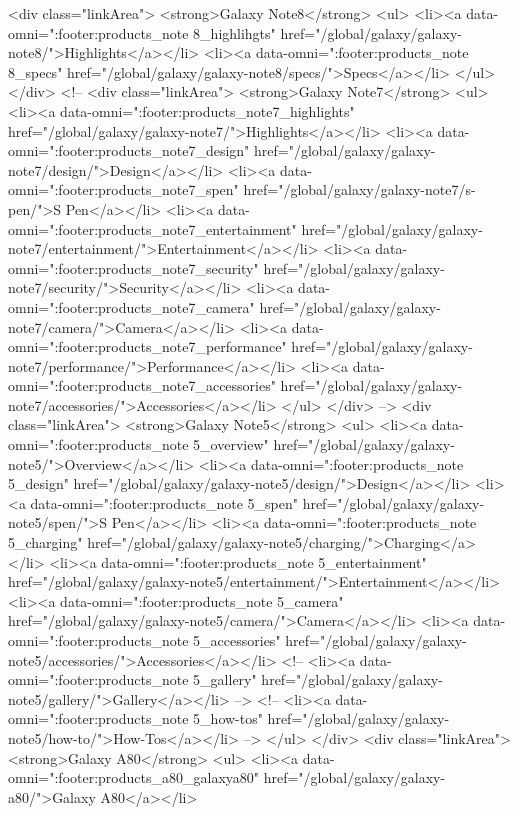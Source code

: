 {{{{{{{{{{{{{{{{{{{{{{{{{{{{{{{{{{{{{{{{{{{{{{{{{{{{{		<div class="linkArea">
			<strong>Galaxy Note8</strong>
			<ul>
				<li><a data-omni=":footer:products_note 8_highlihgts" href="/global/galaxy/galaxy-note8/">Highlights</a></li>
				<li><a data-omni=":footer:products_note 8_specs" href="/global/galaxy/galaxy-note8/specs/">Specs</a></li>
			</ul>
		</div>
		<!-- <div class="linkArea">
			<strong>Galaxy Note7</strong>
			<ul>
				<li><a data-omni=":footer:products_note7_highlights" href="/global/galaxy/galaxy-note7/">Highlights</a></li>
				<li><a data-omni=":footer:products_note7_design" href="/global/galaxy/galaxy-note7/design/">Design</a></li>
				<li><a data-omni=":footer:products_note7_spen" href="/global/galaxy/galaxy-note7/s-pen/">S Pen</a></li>
				<li><a data-omni=":footer:products_note7_entertainment" href="/global/galaxy/galaxy-note7/entertainment/">Entertainment</a></li>
				<li><a data-omni=":footer:products_note7_security" href="/global/galaxy/galaxy-note7/security/">Security</a></li>
				<li><a data-omni=":footer:products_note7_camera" href="/global/galaxy/galaxy-note7/camera/">Camera</a></li>
				<li><a data-omni=":footer:products_note7_performance" href="/global/galaxy/galaxy-note7/performance/">Performance</a></li>
				<li><a data-omni=":footer:products_note7_accessories" href="/global/galaxy/galaxy-note7/accessories/">Accessories</a></li>
			</ul>
		</div> -->
		<div class="linkArea">
			<strong>Galaxy Note5</strong>
			<ul>
				<li><a data-omni=":footer:products_note 5_overview" href="/global/galaxy/galaxy-note5/">Overview</a></li>
				<li><a data-omni=":footer:products_note 5_design" href="/global/galaxy/galaxy-note5/design/">Design</a></li>
				<li><a data-omni=":footer:products_note 5_spen" href="/global/galaxy/galaxy-note5/spen/">S Pen</a></li>
				<li><a data-omni=":footer:products_note 5_charging" href="/global/galaxy/galaxy-note5/charging/">Charging</a></li>
				<li><a data-omni=":footer:products_note 5_entertainment" href="/global/galaxy/galaxy-note5/entertainment/">Entertainment</a></li>
				<li><a data-omni=":footer:products_note 5_camera" href="/global/galaxy/galaxy-note5/camera/">Camera</a></li>
				<li><a data-omni=":footer:products_note 5_accessories" href="/global/galaxy/galaxy-note5/accessories/">Accessories</a></li>
				<!-- <li><a data-omni=":footer:products_note 5_gallery" href="/global/galaxy/galaxy-note5/gallery/">Gallery</a></li> -->
				<!-- <li><a data-omni=":footer:products_note 5_how-tos" href="/global/galaxy/galaxy-note5/how-to/">How-Tos</a></li> -->
			</ul>
		</div>
		<div class="linkArea">
			<strong>Galaxy A80</strong>
			<ul>
				<li><a data-omni=":footer:products_a80_galaxya80" href="/global/galaxy/galaxy-a80/">Galaxy A80</a></li>
}}}}}}}}}}}}}}}}}}}}}}}}}}}}}}}}}}}}}}}}}}}}}}}}}}}}}
